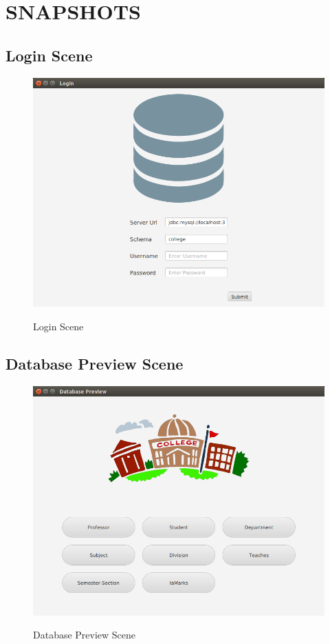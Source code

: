 \chapter{SNAPSHOTS}
\section{Login Scene}
\begin{figure}[H]
\caption{Login Scene}
\includegraphics[scale=.6]{./login.png}
\label{fig:Login Scene}
\end{figure}

\thispagestyle{fancy}


\section{Database Preview Scene}
\begin{figure}[H]
\caption{Database Preview Scene}
\includegraphics[scale=0.6]{./database_preview.png}
\label{fig:Database Preview Scene}
\end{figure}

